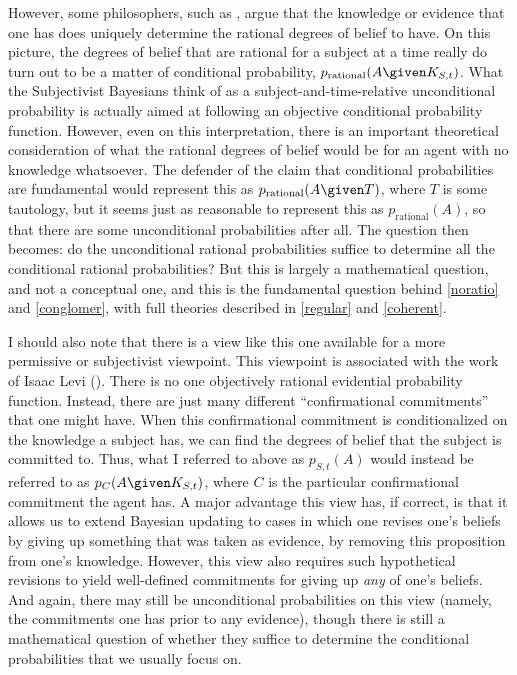 However, some philosophers, such as \citet{uniqueness}, argue that the knowledge or evidence that one has does uniquely determine the rational degrees of belief to have. On this picture, the degrees of belief that are rational for a subject at a time really do turn out to be a matter of conditional probability, $p_{\text{rational}}(A \given K_{S,t})$. What the Subjectivist Bayesians think of as a subject-and-time-relative unconditional probability is actually aimed at following an objective conditional probability function. However, even on this interpretation, there is an important theoretical consideration of what the rational degrees of belief would be for an agent with no knowledge whatsoever. The defender of the claim that conditional probabilities are fundamental would represent this as $p_{\text{rational}}(A \given T)$, where $T$ is some tautology, but it seems just as reasonable to represent this as $p_{\text{rational}}(A)$, so that there are some unconditional probabilities after all. The question then becomes: do the unconditional rational probabilities suffice to determine all the conditional rational probabilities? But this is largely a mathematical question, and not a conceptual one, and this is the fundamental question behind \autoref{noratio} and \autoref{conglomer}, with full theories described in \autoref{regular} and \autoref{coherent}.

I should also note that there is a view like this one available for a more permissive or subjectivist viewpoint. This viewpoint is associated with the work of Isaac Levi (\citeyear{enterprise}). There is no one objectively rational evidential probability function. Instead, there are just many different ``confirmational commitments'' that one might have. When this confirmational commitment is conditionalized on the knowledge a subject has, we can find the degrees of belief that the subject is committed to. Thus, what I referred to above as $p_{S,t}(A)$ would instead be referred to as $p_C(A \given K_{S,t})$, where $C$ is the particular confirmational commitment the agent has. A major advantage this view has, if correct, is that it allows us to extend Bayesian updating to cases in which one revises one's beliefs by giving up something that was taken as evidence, by removing this proposition from one's knowledge. However, this view also requires such hypothetical revisions to yield well-defined commitments for giving up \emph{any} of one's beliefs. And again, there may still be unconditional probabilities on this view (namely, the commitments one has prior to any evidence), though there is still a mathematical question of whether they suffice to determine the conditional probabilities that we usually focus on.

